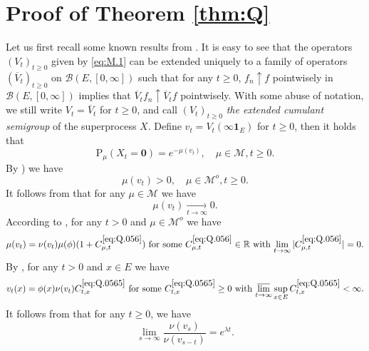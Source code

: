 \documentclass[12pt,a4paper]{amsart}
\numberwithin{equation}{section}
\theoremstyle{plain}
\theoremstyle{definition}
\theoremstyle{remark}
\begin{document}
\section{Proof of Theorem \ref{thm:Q}} \label{sec:Q}
	
	Let us first recall some known results from \cite{LiuRenSongSun2020}.
	It is easy to see that the operators $(V_t)_{t\geq 0}$
	given by \eqref{eq:M.1} can be extended uniquely to a family of operators $(\overline V_t)_{t\geq 0}$ on $\mathcal B(E,[0,\infty])$ such that for any $t\geq 0$, $f_n \uparrow f$ pointwisely in  $\mathcal B(E, [0,\infty])$ implies that $\overline V_tf_n \uparrow \overline V_tf$ pointwisely.
	With some abuse of notation, we still write $V_t = \overline V_t$ for $t\geq 0$, and call $(V_t)_{t\geq 0}$ \emph{the extended cumulant semigroup} of the superprocess $X$.
	Define $v_t = V_t(\infty  \mathbf 1_E)$ for $t\geq 0$, then it holds that
	\begin{equation} \label{eq:Q.04}
	\mathrm P_\mu (X_t = \mathbf 0)
	= e^{- \mu (v_t)},
	\quad \mu \in \mathcal M, t\geq 0.
	\end{equation}
By \cite[(2.5)]{LiuRenSongSun2020}) we have
\begin{equation}\label{eq:Q.05}
	\mu(v_t) > 0, \quad \mu \in \mathcal M^o, t \geq 0.
\end{equation}
It follows from \cite[Proposition 2.1]{LiuRenSongSun2020} that for any $\mu\in \mathcal M$ we have
\begin{equation} \label{eq:Q.055}
	\mu(v_t) \xrightarrow[t\to \infty]{} 0.
\end{equation}
According to \cite[(2.12)]{LiuRenSongSun2020}, for any
$t>0$ and $\mu \in \mathcal M^o$ we have
\begin{equation} \label{eq:Q.056}
	\text{$\mu(v_t) = \nu(v_t)\mu(\phi) (1+C_{\mu,t}^{\eqref{eq:Q.056}})$ for some $C_{\mu,t}^{\eqref{eq:Q.056}}\in \mathbb R$ with $\lim_{t\to \infty}|C_{\mu,t}^{\eqref{eq:Q.056}}| = 0$.}
\end{equation}
By \cite[(3.14)]{LiuRenSongSun2020}, for any 
$t>0$ and $x\in E$ we have
\begin{equation}  \label{eq:Q.0565}
	\text{$v_t(x) = \phi(x) \nu(v_t) C_{t,x}^{\eqref{eq:Q.0565}}$ for some $C_{t,x}^{\eqref{eq:Q.0565}}\geq 0$ with $\varlimsup_{t\to \infty}\sup_{x\in E}C_{t,x}^{\eqref{eq:Q.0565}}<\infty$.}
\end{equation}
It follows from 	\cite[(3.20)]{LiuRenSongSun2020} that for any
	$t\geq 0$, we have
\begin{equation}\label{eq:Q.057}
	\lim_{s\to \infty} \frac{\nu(v_s)}{\nu(v_{s-t})} = e^{\lambda t}.
\end{equation}
\end{document}
